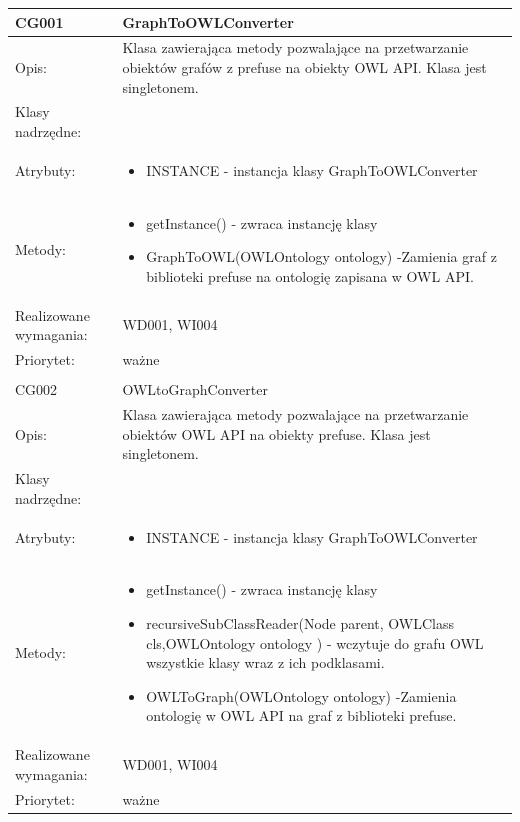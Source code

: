 \documentclass[a4paper,10pt]{article}
\begin{document}
\begin{center}
 


\begin{longtable}{|m{3cm}|m{9cm}|} \hline

CG001 & GraphToOWLConverter \\ \hline
Opis: & Klasa zawierająca metody pozwalające na przetwarzanie obiektów grafów z prefuse na obiekty OWL API. Klasa jest singletonem. \\ \hline
Klasy nadrzędne: &     \\ \hline
Atrybuty: & \begin{itemize}
 \item INSTANCE - instancja klasy GraphToOWLConverter 
\end{itemize}
 \\ \hline
Metody: & \begin{itemize}
	\item getInstance() - zwraca instancję klasy
	\item GraphToOWL(OWLOntology ontology) -Zamienia graf z biblioteki prefuse na ontologię zapisana w OWL API.
\end{itemize}
  \\ \hline
Realizowane wymagania: & WD001, WI004 \\ \hline
Priorytet: & ważne  \\ \hline

\multicolumn{2}{c}{} \\
 \hline

CG002 & OWLtoGraphConverter \\ \hline
Opis: & Klasa zawierająca metody pozwalające na przetwarzanie obiektów OWL API na obiekty prefuse. Klasa jest singletonem.\\ \hline
Klasy nadrzędne: &     \\ \hline
Atrybuty: & \begin{itemize}
 \item INSTANCE - instancja klasy GraphToOWLConverter 
\end{itemize}
 \\ \hline
Metody: & \begin{itemize}
	\item getInstance() - zwraca instancję klasy
	\item recursiveSubClassReader(Node parent, OWLClass cls,OWLOntology ontology ) - wczytuje do grafu OWL wszystkie klasy wraz z ich podklasami.
 	\item OWLToGraph(OWLOntology ontology) -Zamienia ontologię w OWL API na graf z biblioteki prefuse.
\end{itemize}
  \\ \hline
Realizowane wymagania: & WD001, WI004 \\ \hline
Priorytet: & ważne  \\ \hline



\end{longtable}

\end{center}
\end{document}
